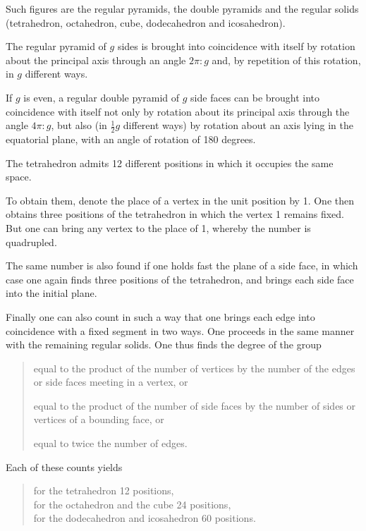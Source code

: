 
Such figures are the regular pyramids, the double pyramids
and the regular solids (tetrahedron, octahedron, cube,
dodecahedron and icosahedron).

The regular pyramid of $g$ sides is brought into coincidence with
itself by rotation about the principal axis through an angle
$2\pi:g$ and, by repetition of this rotation, in $g$ different ways.

If $g$ is even, a regular double pyramid of $g$ side faces can be
brought into coincidence with itself not only by rotation about its
principal axis through the angle $4\pi:g$, but also (in $\tfrac{1}{2}g$
different ways) by rotation about an axis lying in the equatorial
plane, with an angle of rotation of 180 degrees.

The tetrahedron admits 12 different positions in which it
occupies the same space.

To obtain them, denote the place of a vertex in the unit position
by 1. One then obtains three positions of the tetrahedron in which
the vertex 1 remains fixed. But one can bring any vertex to the
place of 1, whereby the number is quadrupled.

The same number is also found if one holds fast the plane of a
side face, in which case one again finds three positions of the
tetrahedron, and brings each side face into the initial plane.

Finally one can also count in such a way that one brings each
edge into coincidence with a fixed segment in two ways. One proceeds
in the same manner with the remaining regular solids. One thus finds
the degree of the group

\begin{quote}
equal to the product of the number of vertices by the number of the
edges or side faces meeting in a vertex, or

equal to the product of the number of side faces by the number of
sides or vertices of a bounding face, or

equal to twice the number of edges.
\end{quote}

Each of these counts yields

\begin{quote}
for the tetrahedron 12 positions,\\
for the octahedron and the cube 24 positions,\\
for the dodecahedron and icosahedron 60 positions.
\end{quote}

